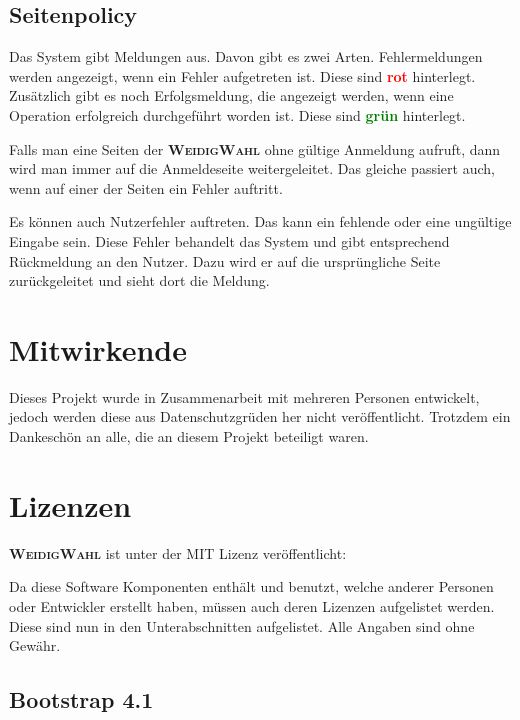 \documentclass[ngerman]{ltxdoc}
\newcommand{\name}{\textbf{\textsc{WeidigWahl}}\xspace}
\begin{document}
\subsection{Seitenpolicy}

Das System gibt Meldungen aus. Davon gibt es zwei Arten. Fehlermeldungen werden
angezeigt, wenn ein Fehler aufgetreten ist. Diese sind \textcolor{red}{\textbf{rot}} hinterlegt.
Zusätzlich gibt es noch Erfolgsmeldung, die angezeigt werden, wenn eine Operation
erfolgreich durchgeführt worden ist. Diese sind \textcolor{green}{\textbf{grün}} hinterlegt.

Falls man eine Seiten der \name ohne gültige Anmeldung aufruft, dann wird man immer
auf die Anmeldeseite weitergeleitet. Das gleiche passiert auch, wenn auf einer der
Seiten ein Fehler auftritt.

Es können auch Nutzerfehler auftreten. Das kann ein fehlende oder eine ungültige
Eingabe sein. Diese Fehler behandelt das System und gibt entsprechend Rückmeldung
an den Nutzer. Dazu wird er auf die ursprüngliche Seite zurückgeleitet und sieht dort
die Meldung.

\section{Mitwirkende}

Dieses Projekt wurde in Zusammenarbeit mit mehreren Personen entwickelt, jedoch werden diese aus Datenschutzgrüden
her nicht veröffentlicht. Trotzdem ein Dankeschön an alle, die an diesem Projekt
beteiligt waren.

\section{Lizenzen}

\name ist unter der MIT Lizenz veröffentlicht:



Da diese Software Komponenten enthält und benutzt, welche anderer Personen oder
Entwickler erstellt haben, müssen auch deren Lizenzen aufgelistet werden. Diese
sind nun in den Unterabschnitten aufgelistet. Alle Angaben sind ohne Gewähr.

\subsection{Bootstrap 4.1}


\end{document}
